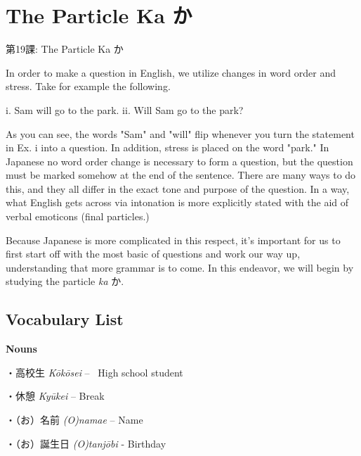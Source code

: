     
\chapter{The Particle Ka か}

\begin{center}
\begin{Large}
第19課: The Particle Ka か 
\end{Large}
\end{center}
 
\par{ In order to make a question in English, we utilize changes in word order and stress. Take for example the following. }

\par{i. Sam will go to the park. \hfill\break
ii. Will Sam go to the park? }

\par{ As you can see, the words "Sam" and "will" flip whenever you turn the statement in Ex. i into a question. In addition, stress is placed on the word "park." In Japanese no word order change is necessary to form a question, but the question must be marked somehow at the end of the sentence. There are many ways to do this, and they all differ in the exact tone and purpose of the question. In a way, what English gets across via intonation is more explicitly stated with the aid of verbal emoticons (final particles.) }

\par{ Because Japanese is more complicated in this respect, it's important for us to first start off with the most basic of questions and work our way up, understanding that more grammar is to come. In this endeavor, we will begin by studying the particle \emph{ka }か. }
      
\section{Vocabulary List}
 
\par{\textbf{Nouns }}

\par{・高校生 \emph{Kōkōsei }–  High school student }

\par{・休憩 \emph{Kyūkei }– Break }

\par{・（お）名前 \emph{(O)namae }– Name }

\par{・（お）誕生日 \emph{(O)tanjōbi }- Birthday }

